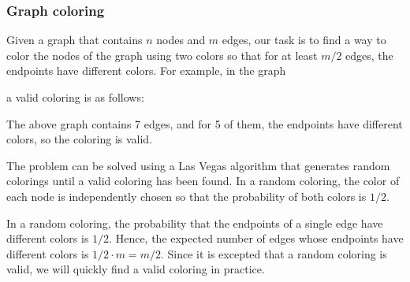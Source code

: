\subsubsection{Graph coloring}


Given a graph that contains $n$ nodes and $m$ edges,
our task is to find a way to color the nodes
of the graph using two colors so that
for at least $m/2$ edges, the endpoints 
have different colors.
For example, in the graph
\begin{center}
\end{center}
a valid coloring is as follows:
\begin{center}
\end{center}
The above graph contains 7 edges, and for 5 of them,
the endpoints have different colors,
so the coloring is valid.

The problem can be solved using a Las Vegas algorithm
that generates random colorings until a valid coloring
has been found.
In a random coloring, the color of each node is
independently chosen so that the probability of
both colors is $1/2$.

In a random coloring, the probability that the endpoints
of a single edge have different colors is $1/2$.
Hence, the expected number of edges whose endpoints
have different colors is $1/2 \cdot m = m/2$.
Since it is excepted that a random coloring is valid,
we will quickly find a valid coloring in practice.

